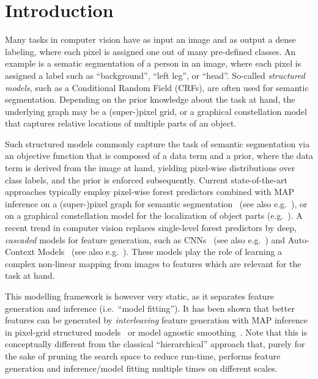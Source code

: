 \documentclass[10pt,twocolumn,letterpaper]{article}
\begin{document}
\section{Introduction}
Many tasks in computer vision have as input an image and as output a dense labeling, where each pixel is assigned one out of many pre-defined classes. An example is a sematic segmentation of a person in an image, where each pixel is assigned a label such as “background”, “left leg”, or “head”. 
%
So-called \emph{structured models}, such as a Conditional Random Field (CRFs), are often used for semantic segmentation. 
Depending on the prior knowledge about the task at hand, the underlying graph may be a (super-)pixel grid, or a graphical constellation model that captures relative locations of multiple parts of an object. 
%

Such structured models commonly capture the task of semantic segmentation via an objective function that is composed of a data term and a prior, 
%
where the data term is derived from the image at hand, yielding pixel-wise distributions over class labels, and the prior is enforced subsequently. 
%
%
Current state-of-the-art approaches typically employ pixel-wise forest predictors combined with MAP inference on a (super-)pixel graph for semantic segmentation~\cite{TextonBoost,Schroff08objectclass} (see also e.g.\ \cite{funke2014candidate}), or on a graphical constellation model for the localization of object parts (e.g.\ \cite{Glocker2012,Glocker2013,TeethMICCAI2012,SeifertAnatomicalSPIE2009}). 
%
A recent trend in computer vision replaces single-level forest predictors by deep, \emph{cascaded} models for feature generation, such as CNNs~\cite{NIPS2012_4824} (see also e.g.\ \cite{funke2014candidate}) and Auto-Context Models~\cite{AutoContext2008} (see also e.g.\ \cite{PoseMachinesECCV2014}). 
%
These models play the role of learning a complex non-linear mapping from images to features which are relevant for the task at hand. 

This modelling framework is however very static, as it separates feature generation and inference (i.e.\ "`model fitting"'). 
%
It has been shown that better features can be generated by \emph{interleaving} feature generation with MAP inference in pixel-grid structured models~\cite{DTF,RTF,UweCVPR2013} 
%
or model agnostic smoothing~\cite{GeoForests2013}. Note that this is conceptually different from the classical ``hierarchical'' approach that, purely for the sake of pruning the search space to reduce run-time, performs feature generation and inference/model fitting multiple times on different scales.
\end{document}
